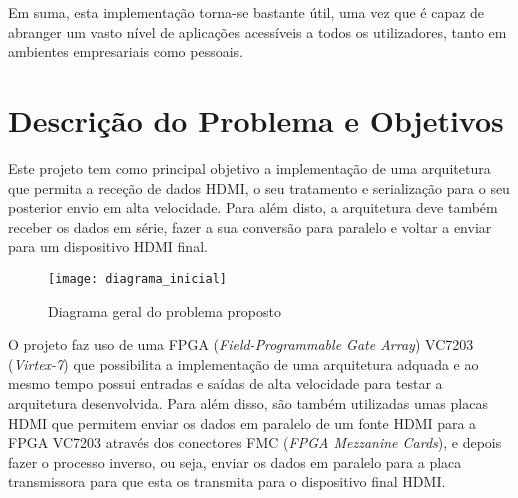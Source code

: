 Em suma, esta implementação torna-se bastante útil, uma vez que é capaz de abranger um vasto nível de aplicações acessíveis a todos os utilizadores, tanto em ambientes empresariais como pessoais.

%

\section{Descrição do Problema e Objetivos} \label{sec:descrição_objetivos}

Este projeto tem como principal objetivo a implementação de uma arquitetura que permita a receção de dados HDMI, o seu tratamento e serialização para o seu posterior envio em alta velocidade. Para além disto, a arquitetura deve também receber os dados em série, fazer a sua conversão para paralelo e voltar a enviar para um dispositivo HDMI final.

\begin{figure}[h!]
	\begin{center}
		\leavevmode
		\texttt{[image: diagrama\_inicial]}
		\caption{Diagrama geral do problema proposto}
		\label{fig:diagrama_inicial}
	\end{center}
\end{figure}

O projeto faz uso de uma FPGA (\textit{Field-Programmable Gate Array}) VC7203 (\textit{Virtex-7}) que possibilita a implementação de uma arquitetura adquada e ao mesmo tempo possui entradas e saídas de alta velocidade para testar a arquitetura desenvolvida. Para além disso, são também utilizadas umas placas HDMI que permitem enviar os dados em paralelo de um fonte HDMI para a FPGA VC7203 através dos conectores FMC (\textit{FPGA Mezzanine Cards}), e depois fazer o processo inverso, ou seja, enviar os dados em paralelo para a placa transmissora para que esta os transmita para o dispositivo final HDMI.

